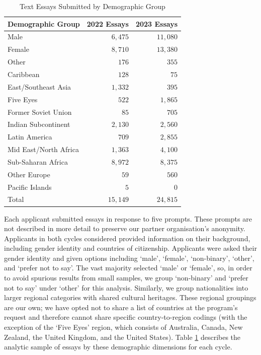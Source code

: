 \begin{table}[tbh]
    \centering
    \caption{Text Essays Submitted by Demographic Group}
    \label{tab:demo_counts}
    \begin{tabular}{ l r r }
        \toprule
        Demographic Group & 2022 Essays & 2023 Essays \\
        \midrule
        Male & $6,475$  & $11,080$ \\
        Female & $8,710$  & $13,380$ \\
        Other & $176$ & $355$ \\
        \midrule
        Caribbean & $128$ & $75$ \\
        East/Southeast Asia & $1,332$ & $395$ \\
        Five Eyes & $522$ & $1,865$ \\
        Former Soviet Union & $85$ & $705$ \\
        Indian Subcontinent & $2,130$ & $2,560$\\
        Latin America & $709$ & $2,855$ \\
        Mid East/North Africa & $1,363$ & $4,100$ \\
        Sub-Saharan Africa & $8,972$& $8,375$\\
        Other Europe & $59$ & $560$ \\
        Pacific Islands & $5$& $0$ \\
        \midrule
        Total & $15,149$ & $24,815$ \\
        \bottomrule
    \end{tabular}
\end{table}

Each applicant submitted essays in response to five prompts. These prompts are not described in more detail to preserve our partner organisation's anonymity. Applicants in both cycles considered provided information on their background, including gender identity and countries of citizenship. Applicants were asked their gender identity and given options including `male', `female', `non-binary', `other', and `prefer not to say'. The vast majority selected `male' or `female', so, in order to avoid spurious results from small samples, we group `non-binary' and `prefer not to say' under `other' for this analysis. Similarly, we group nationalities into larger regional categories with shared cultural heritages. These regional groupings are our own; we have opted not to share a list of countries at the program's request and therefore cannot share specific country-to-region codings (with the exception of the `Five Eyes' region, which consists of Australia, Canada, New Zealand, the United Kingdom, and the United States). Table \ref{tab:demo_counts} describes the analytic sample of essays by these demographic dimensions for each cycle. 

